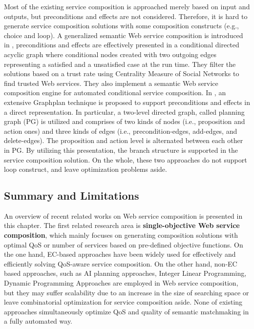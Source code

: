 Most of the existing service composition is approached merely based on input and outputs, but preconditions and effects are not considered. Therefore, it is hard to generate service composition solutions with some composition constructs (e.g., choice and loop). A generalized semantic Web service composition is introduced in \cite{bansal2016generalized}, preconditions and effects are effectively presented in a conditional directed acyclic graph where conditional nodes created with two outgoing edges representing a satisfied and a unsatisfied case at the run time. They filter the solutions based on a trust rate using Centrality Measure of Social Networks to find trusted Web services. They also implement a semantic Web service composition engine for automated conditional service composition. In \cite{wang2016automatic}, an extensive Graphplan technique is proposed to support preconditions and effects in a direct representation. In particular, a two-level directed graph, called planning graph (PG) is utilized and comprises of two kinds of nodes (i.e., proposition and action ones) and three kinds of edges (i.e., precondition-edges, add-edges, and delete-edges). The proposition and action level is alternated between each other in PG. By utilizing this presentation, the branch structure is supported in the service composition solution. On the whole, these two approaches do not support loop construct, and leave optimization problems aside.


\subsection{Summary and Limitations}\label{summary}

An overview of recent related works on Web service composition is presented in this chapter. The first related research area is \textbf{single-objective Web service composition}, which mainly focuses on generating composition solutions with optimal QoS or number of services based on pre-defined objective functions. On the one hand, EC-based approaches have been widely used for effectively and efficiently solving QoS-aware service composition. On the other hand, non-EC based approaches, such as AI planning approaches, Integer Linear Programming, Dynamic Programming Approaches are employed in Web service composition, but they may suffer scalability due to an increase in the size of searching space or leave combinatorial optimization for service composition aside. None of existing approaches simultaneously optimize QoS and quality of semantic matchmaking in a fully automated way.

